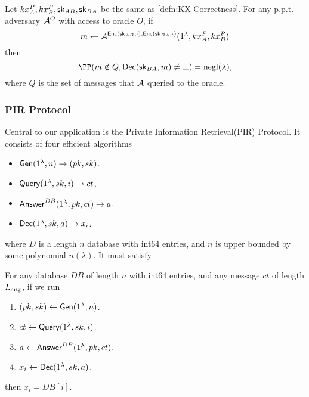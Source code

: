 \begin{definition}
Let $kx^P_A, kx^P_B, {\mathsf{sk}}_{AB}, {\mathsf{sk}}_{BA}$ be the same as \cref{defn:KX-Correctness}. For any p.p.t. adversary $\mathcal{A}^O$ with access to oracle $O$, if
$$m \leftarrow \mathcal{A}^{\mathsf{Enc}({\mathsf{sk}}_{AB}, \cdot), \mathsf{Enc}({\mathsf{sk}}_{BA}, \cdot)}(1^{\lambda}, kx^P_A, kx^P_B)$$
then 
$$\PP(m \notin Q, \Dec(\sk_{BA}, m) \neq \bot) = \negl(\lambda),$$
where $Q$ is the set of messages that $\mathcal{A}$ queried to the oracle.
\end{definition}

\subsubsection{PIR Protocol}
Central to our application is the Private Information Retrieval(PIR) Protocol. It consists of four efficient algorithms
\begin{itemize}
    \item $\mathsf{Gen}(1^{\lambda}, n) \to (pk, sk)$.
    \item $\mathsf{Query}(1^{\lambda}, sk, i) \to ct$.
    \item $\mathsf{Answer}^{DB}(1^{\lambda}, pk, ct) \to a$.
    \item $\mathsf{Dec}(1^{\lambda}, sk, a) \to x_i$.
\end{itemize}
where $D$ is a length $n$ database with int64 entries, and $n$ is upper bounded by some polynomial $n(\lambda)$. It must satisfy
\begin{definition}[Correctness]
For any database $DB$ of length $n$ with int64 entries, and any message $ct$ of length $L_{\mathsf{msg}}$, if we run
\begin{enumerate}
    \item $(pk, sk) \leftarrow \mathsf{Gen}(1^{\lambda}, n)$.
    \item $ct \leftarrow \mathsf{Query}(1^{\lambda}, sk, i)$.
    \item $a \leftarrow \mathsf{Answer}^{DB}(1^{\lambda}, pk, ct)$.
    \item $x_i \leftarrow \mathsf{Dec}(1^{\lambda}, sk, a)$.
\end{enumerate}
then $x_i = DB[i]$.
\end{definition}
